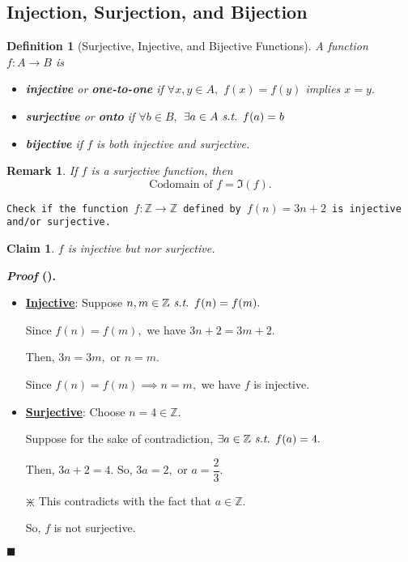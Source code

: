\documentclass[12pt,a4paper]{article}
\newtheorem{df}{Definition}[subsection]
\newtheorem{clm}{Claim}[subsection]
\newcounter{nprf}[subsection]
\newtheorem*{rmk}{\indent Remark}
\newenvironment*{prf}{\par\indent\textbf{\textit{Proof} (\stepcounter{nprf}\thenprf). }\par }{\par\hfill $\blacksquare$\par}
\def\Z{{\mathbb{Z}}}
\def\st{\emph{ s.t. }}
\begin{document}
\subsection{Injection, Surjection, and Bijection}
\begin{df}[Surjective, Injective, and Bijective Functions]
	A function $f: A\to B$ is 
	\begin{itemize}
		\item \textbf{injective} or \textbf{one-to-one} if $\forall x,y\in A,$ $f(x)=f(y)$ implies $x=y.$
		\item \textbf{surjective} or \textbf{onto} if $\forall b\in B,$ $\exists a\in A\st f(a)=b$
		\item \textbf{bijective} if $f$ is both injective and surjective. 
	\end{itemize}	
\end{df}
\begin{rmk}
	If $f$ is a surjective function, then \[\text{Codomain of }f=\Im(f).\]	
\end{rmk}
\begin{framed}
\noindent\texttt{Check if the function $f:\Z\to\Z$ defined by $f(n)=3n+2$ is injective and/or surjective.}
\begin{clm} $f$ is injective but nor surjective. \end{clm}
\begin{prf}
\begin{itemize}
	\item \textbf{\underline{Injective}}: Suppose $n,m\in\Z\st f(n)=f(m).$\par Since $f(n)=f(m),$ we have $3n+2=3m+2.$\par Then, $3n=3m,$ or $n=m.$\par Since $f(n)=f(m)\implies n=m,$ we have $f$ is injective. 
	\item \textbf{\underline{Surjective}}: Choose $n=4\in\Z.$\par Suppose for the sake of contradiction, $\exists a\in\Z\st f(a)=4.$\par Then, $3a+2=4.$ So, $3a=2,$ or $a=\dfrac{2}{3}.$\par \begin{center}$\divideontimes$ This contradicts with the fact that $a\in\Z.$\end{center}\par So, $f$ is not surjective. 
\end{itemize}	
\end{prf}
\end{framed}
\end{document}
